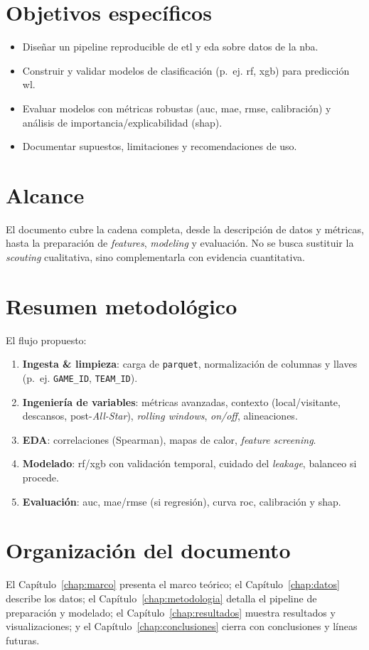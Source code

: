 \section*{Objetivos específicos}
\begin{itemize}
  \item Diseñar un pipeline reproducible de \gls{etl} y \gls{eda} sobre datos de la \gls{nba}.
  \item Construir y validar modelos de clasificación (p.~ej. \gls{rf}, \gls{xgb}) para predicción \gls{wl}.
  \item Evaluar modelos con métricas robustas (\gls{auc}, \gls{mae}, \gls{rmse}, calibración) y análisis de importancia/explicabilidad (\gls{shap}).
  \item Documentar supuestos, limitaciones y recomendaciones de uso.
\end{itemize}

\section*{Alcance}
El documento cubre la cadena completa, desde la descripción de datos y métricas, hasta la preparación de \textit{features}, 
\textit{modeling} y evaluación. No se busca sustituir la \textit{scouting} cualitativa, sino complementarla con evidencia cuantitativa.

\section*{Resumen metodológico}
El flujo propuesto:
\begin{enumerate}
  \item \textbf{Ingesta \& limpieza}: carga de \texttt{parquet}, normalización de columnas y llaves (p.~ej. \texttt{GAME\_ID}, \texttt{TEAM\_ID}).
  \item \textbf{Ingeniería de variables}: métricas avanzadas, contexto (local/visitante, descansos, post-\textit{All-Star}), \textit{rolling windows}, \textit{on/off}, alineaciones.
  \item \textbf{EDA}: correlaciones (Spearman), mapas de calor, \textit{feature screening}.
  \item \textbf{Modelado}: \gls{rf}/\gls{xgb} con validación temporal, cuidado del \textit{leakage}, balanceo si procede.
  \item \textbf{Evaluación}: \gls{auc}, \gls{mae}/\gls{rmse} (si regresión), curva \gls{roc}, calibración y \gls{shap}.
\end{enumerate}

\section*{Organización del documento}
El Capítulo~\ref{chap:marco} presenta el marco teórico; el Capítulo~\ref{chap:datos} describe los datos; 
el Capítulo~\ref{chap:metodologia} detalla el pipeline de preparación y modelado; 
el Capítulo~\ref{chap:resultados} muestra resultados y visualizaciones; y el Capítulo~\ref{chap:conclusiones} cierra con conclusiones y líneas futuras.
